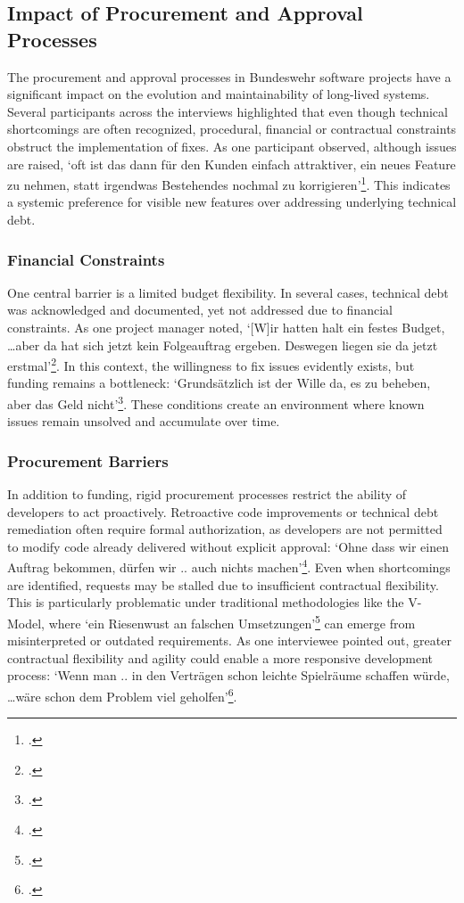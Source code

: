 \subsection{Impact of Procurement and Approval Processes}
The procurement and approval processes in Bundeswehr software projects have a significant impact on the evolution and maintainability of long-lived systems. Several participants across the interviews highlighted that even though technical shortcomings are often recognized, 
procedural, financial or contractual constraints obstruct the implementation of fixes. As one participant observed, although issues are raised, `oft ist das dann für den Kunden einfach attraktiver, ein neues Feature zu nehmen, statt irgendwas Bestehendes nochmal zu korrigieren'\footcite[80]{Interview32025}.
This indicates a systemic preference for visible new features over addressing underlying technical debt.

\subsubsection{Financial Constraints}
One central barrier is a limited budget flexibility. In several cases, technical debt was acknowledged and documented, yet not addressed due to financial constraints. As one project manager noted, `[W]ir hatten halt ein festes Budget, \ldots aber da hat sich jetzt kein Folgeauftrag ergeben. Deswegen liegen sie da jetzt erstmal'\footcite[79]{Interview12025}.
In this context, the willingness to fix issues evidently exists, but funding remains a bottleneck: `Grundsätzlich ist der Wille da, es zu beheben, aber das Geld nicht'\footcite[85]{Interview32025}. These conditions create an environment where known issues remain unsolved and accumulate over time.

\subsubsection{Procurement Barriers}
In addition to funding, rigid procurement processes restrict the ability of developers to act proactively. Retroactive code improvements or technical debt remediation often require formal authorization, as developers are not permitted to modify code already delivered without explicit approval:
`Ohne dass wir einen Auftrag bekommen, dürfen wir .. auch nichts machen'\footcite[84]{Interview32025}. Even when shortcomings are identified, requests may be stalled due to insufficient contractual flexibility. This is particularly problematic under traditional methodologies like the V-Model, where
`ein Riesenwust an falschen Umsetzungen'\footcite[85]{Interview32025} can emerge from misinterpreted or outdated requirements. As one interviewee pointed out, greater contractual flexibility and agility could enable a more responsive development process:
`Wenn man .. in den Verträgen schon leichte Spielräume schaffen würde, \ldots wäre schon dem Problem viel geholfen'\footcite[84]{Interview32025}.

